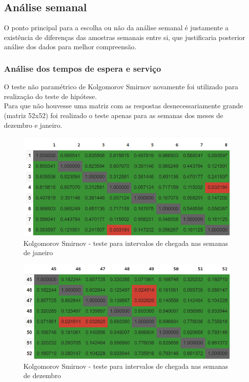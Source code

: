 \subsection{Análise semanal}
O ponto principal para a escolha ou não da análise semanal é justamente a existência de diferenças das amostras semanais entre si, que justificaria posterior análise dos dados para melhor compreensão.\\
\subsubsection{Análise dos tempos de espera e serviço}
O teste não paramétrico de Kolgomorov Smirnov novamente foi utilizado para realização do teste de hipótese.\\
Para que não houvesse uma matriz com as respostas desnecessariamente grande (matriz 52x52) foi realizado o teste apenas para as semanas dos meses de dezembro e janeiro.\\
    \begin{figure}[H]
        \includegraphics{analise-de-dados/semanal/janas.png}
        \caption{Kolgomorov Smirnov - teste para intervalos de chegada nas semanas de janeiro}
        \label{fig: jan_as_img}
    \end{figure}
    \begin{figure}[H]
        \includegraphics{analise-de-dados/semanal/dezas.png}
        \caption{Kolgomorov Smirnov - teste para intervalos de chegada nas semanas de dezembro}
        \label{fig: dez_as_img}
    \end{figure}

